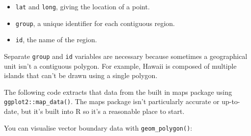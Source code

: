 \begin{itemize}
\tightlist
\item
  \texttt{lat} and \texttt{long}, giving the location of a point.
\item
  \texttt{group}, a unique identifier for each contiguous region.
\item
  \texttt{id}, the name of the region.
\end{itemize}

Separate \texttt{group} and \texttt{id} variables are necessary because
sometimes a geographical unit isn't a contiguous polygon. For example,
Hawaii is composed of multiple islands that can't be drawn using a
single polygon.

The following code extracts that data from the built in maps package
using \texttt{ggplot2::map\_data()}. The maps package isn't particularly
accurate or up-to-date, but it's built into R so it's a reasonable place
to start. 

\begin{Shaded}
\end{Shaded}

You can visualise vector boundary data with \texttt{geom\_polygon()}:

\begin{Shaded}
\begin{Highlighting}[]
\OperatorTok{+}
\StringTok{  }\NormalTok{(}\NormalTok{(}\OperatorTok{+}\StringTok{ }
\StringTok{  }\NormalTok{()}

\OperatorTok{+}
\StringTok{  }\NormalTok{(}\NormalTok{(} \NormalTok{, } \NormalTok{) }\OperatorTok{+}\StringTok{ }
\StringTok{  }\NormalTok{()}
\end{Highlighting}
\end{Shaded}

